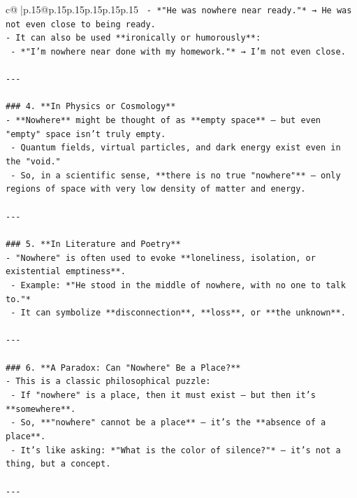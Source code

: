 \documentclass{article}
\begin{document}
{\begin{supertabular}{c@{$\;$}|p{.15\linewidth}@{}p{.15\linewidth}p{.15\linewidth}p{.15\linewidth}p{.15\linewidth}p{.15\linewidth}}
{{{\texttt{  {-} *"He was nowhere near ready."* → He was not even close to being ready.} \\
\texttt{{-} It can also be used **ironically or humorously**:} \\
\texttt{  {-} *"I’m nowhere near done with my homework."* → I’m not even close.} \\
\\ 
\texttt{{-}{-}{-}} \\
\\ 
\texttt{\#\#\# 4. **In Physics or Cosmology**} \\
\texttt{{-} **Nowhere** might be thought of as **empty space** — but even "empty" space isn’t truly empty.} \\
\texttt{  {-} Quantum fields, virtual particles, and dark energy exist even in the "void."} \\
\texttt{  {-} So, in a scientific sense, **there is no true "nowhere"** — only regions of space with very low density of matter and energy.} \\
\\ 
\texttt{{-}{-}{-}} \\
\\ 
\texttt{\#\#\# 5. **In Literature and Poetry**} \\
\texttt{{-} "Nowhere" is often used to evoke **loneliness, isolation, or existential emptiness**.} \\
\texttt{  {-} Example: *"He stood in the middle of nowhere, with no one to talk to."*} \\
\texttt{  {-} It can symbolize **disconnection**, **loss**, or **the unknown**.} \\
\\ 
\texttt{{-}{-}{-}} \\
\\ 
\texttt{\#\#\# 6. **A Paradox: Can "Nowhere" Be a Place?**} \\
\texttt{{-} This is a classic philosophical puzzle:  } \\
\texttt{  {-} If "nowhere" is a place, then it must exist — but then it’s **somewhere**.} \\
\texttt{  {-} So, **"nowhere" cannot be a place** — it’s the **absence of a place**.} \\
\texttt{  {-} It’s like asking: *"What is the color of silence?"* — it’s not a thing, but a concept.} \\
\\ 
\texttt{{-}{-}{-}} \\
\\ 
}}}
\end{supertabular}}
\end{document}
